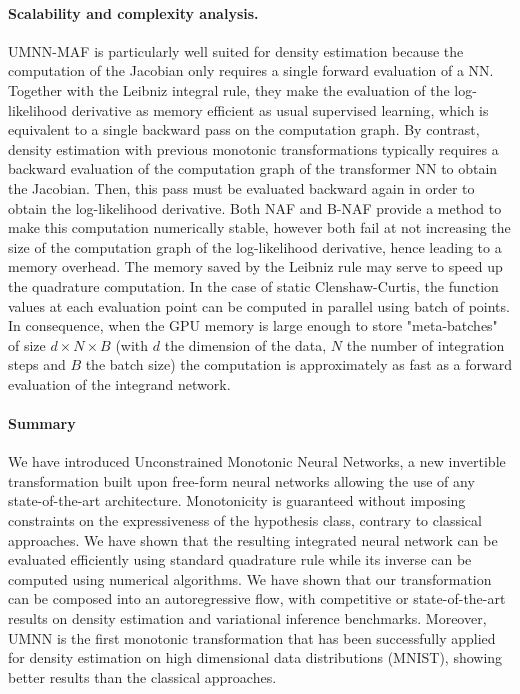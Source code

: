 \paragraph{Scalability and complexity analysis.}
UMNN-MAF is particularly well suited for density estimation because the computation of the Jacobian only requires a single forward evaluation of a NN. Together with the Leibniz integral rule, they make the evaluation of the log-likelihood derivative as memory efficient as usual supervised learning, which is equivalent to a single backward pass on the computation graph. By contrast, density estimation with previous monotonic transformations typically requires a backward evaluation of the computation graph of the transformer NN to obtain the Jacobian. Then, this pass must be evaluated backward again in order to obtain the log-likelihood derivative. Both NAF and B-NAF provide a method to make this computation numerically stable, however both fail at not increasing the size of the computation graph of the log-likelihood derivative, hence leading to a memory overhead. The memory saved by the Leibniz rule may serve to speed up the quadrature computation. In the case of static Clenshaw-Curtis, the function values at each evaluation point can be computed in parallel using batch of points. In consequence, when the GPU memory is large enough to store "meta-batches" of size $d\times N \times B$ (with $d$ the dimension of the data, $N$ the number of integration steps and $B$ the batch size) the computation is approximately as fast as a forward evaluation of the integrand network.


\paragraph{Summary}
We have introduced Unconstrained Monotonic Neural Networks, a new invertible transformation built upon free-form neural networks allowing the use of any state-of-the-art architecture. Monotonicity is guaranteed without imposing constraints on the expressiveness of the hypothesis class, contrary to classical approaches.
We have shown that the resulting integrated neural network can be evaluated efficiently using standard quadrature rule while its inverse can be computed using numerical algorithms.
We have shown that our transformation can be composed into an autoregressive flow, with competitive or state-of-the-art results on density estimation and variational inference benchmarks. Moreover, UMNN is the first monotonic transformation that has been successfully applied for density estimation on high dimensional data distributions (MNIST), showing better results than the classical approaches.

